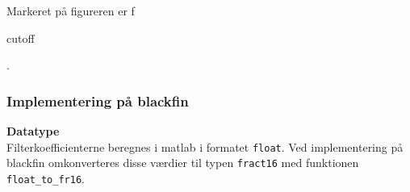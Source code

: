 Markeret på figureren er f\begin{tiny}cutoff\end{tiny}.

\subsubsection{Implementering på blackfin}
\textbf{Datatype} \\
Filterkoefficienterne beregnes i matlab i formatet \verb+float+. Ved implementering på blackfin omkonverteres disse værdier til typen \verb+fract16+ med funktionen \verb+float_to_fr16+.

